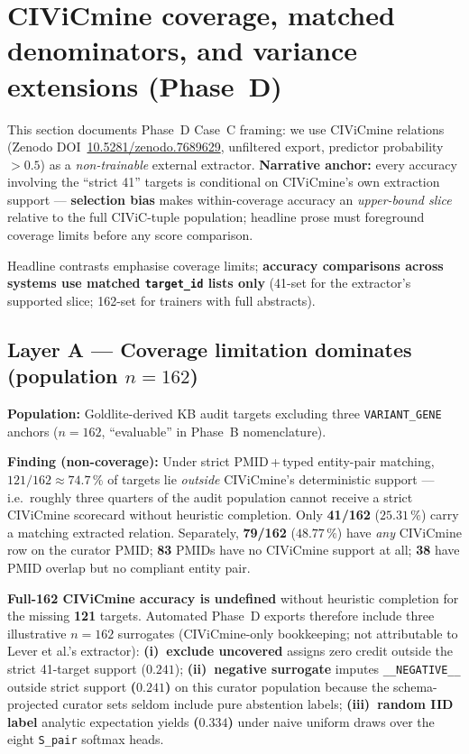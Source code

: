 \setcounter{section}{12}

\section{CIViCmine coverage, matched denominators, and variance extensions (Phase~D)}
\label{supp:civicmine-phase-d}

This section documents Phase~D Case~C framing: we use CIViCmine relations (Zenodo
DOI~\href{https://doi.org/10.5281/zenodo.7689629}{10.5281/zenodo.7689629},
unfiltered export, predictor probability ${>}0.5$) as a \emph{non-trainable}
external extractor. \textbf{Narrative anchor:} every accuracy involving the
``strict 41'' targets is conditional on CIViCmine's own extraction support ---
\textbf{selection bias} makes within-coverage accuracy an \emph{upper-bound
slice} relative to the full CIViC-tuple population; headline prose must foreground
coverage limits before any score comparison.

Headline contrasts emphasise coverage limits; \textbf{accuracy comparisons across
systems use matched \texttt{target\_id} lists only} (41-set for the extractor's
supported slice; 162-set for trainers with full abstracts).

\subsection{Layer A --- Coverage limitation dominates (population $n=162$)}%
\label{supp:civicmine-layer-a}

\textbf{Population:} Goldlite-derived KB audit targets excluding three
\texttt{VARIANT\_GENE} anchors ($n=162$, ``evaluable'' in Phase~B nomenclature).

\textbf{Finding (non-coverage):} Under strict PMID\,+\,typed entity-pair matching,
\textbf{$121/162 \approx 74.7\,\%$} of targets lie \emph{outside} CIViCmine's
deterministic support --- i.e.\ roughly three quarters of the audit population
cannot receive a strict CIViCmine scorecard without heuristic completion. Only
\textbf{41/162} ($25.31\,\%$) carry a matching extracted relation. Separately,
\textbf{79/162} ($48.77\,\%$) have \emph{any} CIViCmine row on the curator PMID;
\textbf{83} PMIDs have no CIViCmine support at all; \textbf{38} have PMID overlap
but no compliant entity pair.

\textbf{Full-162 CIViCmine accuracy is undefined} without heuristic completion for the missing
\textbf{121} targets. Automated Phase~D exports therefore include three illustrative $n=162$
surrogates (CIViCmine-only bookkeeping; not attributable to Lever et al.'s extractor):
\textbf{(i)~exclude uncovered} assigns zero credit outside the strict 41-target support
(\textbf{$0.241$}); \textbf{(ii)~negative surrogate} imputes \texttt{\_\_NEGATIVE\_\_} outside strict support
\textbf{($0.241$)} on this curator population because the schema-projected curator sets seldom include
pure abstention labels; \textbf{(iii)~random IID label} analytic expectation yields \textbf{($0.334$)}
under naive uniform draws over the eight \texttt{S\_pair} softmax heads.

